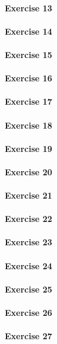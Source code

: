 \paragraph{Exercise 13}
\paragraph{Exercise 14}
\paragraph{Exercise 15}
\paragraph{Exercise 16}
\paragraph{Exercise 17}
\paragraph{Exercise 18}
\paragraph{Exercise 19}
\paragraph{Exercise 20}
\paragraph{Exercise 21}
\paragraph{Exercise 22}
\paragraph{Exercise 23}
\paragraph{Exercise 24}
\paragraph{Exercise 25}
\paragraph{Exercise 26}
\paragraph{Exercise 27}
